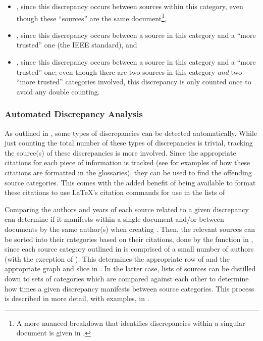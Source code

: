 \begin{itemize}
    \item \textbf{}, since this discrepancy occurs between
          sources within this category, even though these ``sources'' are the
          same document\footnote{A more nuanced breakdown that identifies
              discrepancies within a singular document is given in
              .},
    \item \textbf{}, since this discrepancy occurs between a
          source in this category and a ``more trusted'' one
          (the IEEE standard), and
    \item \textbf{}, since this discrepancy occurs between a
          source in this category and a ``more trusted'' one; even though there
          are two sources in this category \emph{and} two ``more trusted''
          categories involved, this discrepancy is only counted once to avoid
          any double counting.
\end{itemize}

\subsubsection{Automated Discrepancy Analysis}
\label{auto-discrep-analysis}

As outlined in , some types of discrepancies can be detected
automatically. While just counting the total number of these types of
discrepancies is trivial, tracking the source(s) of these discrepancies is more
involved. Since the appropriate citations for each piece of information is
tracked (see  for examples of
how these citations are formatted in the glossaries), they can be used to find
the offending source categories. This comes with the added benefit of being
available to format these citations to use \LaTeX{}'s citation commands for use
in the lists of \autoDiscreps[.]{}

Comparing the authors and years of each source related to a given discrepancy
can determine if it manifests within a single document and/or between documents
by the same author(s) when creating . Then, the
relevant sources can be sorted into their categories based on their citations,
done by the function in , since each source category
outlined in  is comprised of a small number of authors (with the
exception of ).
This determines the appropriate row of  and the appropriate
graph and slice in . In the latter case, lists of
sources can be distilled down to sets of categories which are compared against
each other to determine how times a given discrepancy manifests between source
categories. This process is described in more detail, with examples, in
.

